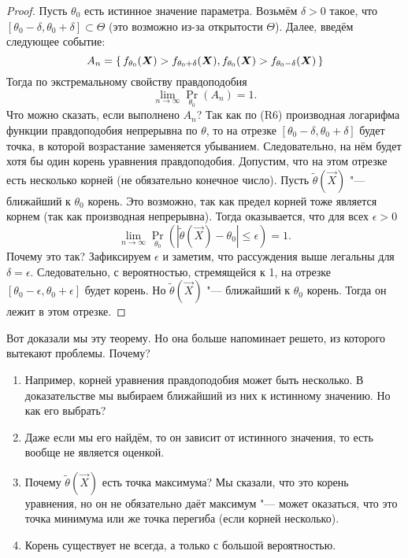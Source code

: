 \begin{proof}
    Пусть $\theta_{0}$ есть истинное значение параметра. Возьмём $\delta > 0$ такое, что $[\theta_{0} - \delta, \theta_{0} + \delta] \subset \Theta$ (это возможно из-за открытости $\Theta$). Далее, введём следующее событие:
    \[
        A_{n} = \set{f_{\theta_{0}}(\bm{X}) > f_{\theta_{0} + \delta}(\bm{X}), f_{\theta_{0}}(\bm{X}) > f_{\theta_{0} - \delta}(\bm{X})}
    \]
    Тогда по экстремальному свойству правдоподобия
    \[
        \lim\limits_{n \to \infty} \Pr_{\theta_{0}}(A_{n}) = 1.
    \]
    Что можно сказать, если выполнено $A_{n}$? Так как по (R6) производная логарифма функции правдоподобия непрерывна по $\theta$, то на отрезке $[\theta_{0} - \delta, \theta_{0} + \delta]$ будет точка, в которой возрастание заменяется убыванием. Следовательно, на нём будет хотя бы один корень уравнения правдоподобия. Допустим, что на этом отрезке есть несколько корней (не обязательно конечное число). Пусть $\tilde{\theta}(\vec{X})$ "--- ближайший к $\theta_{0}$ корень. Это возможно, так как предел корней тоже является корнем (так как производная непрерывна). Тогда оказывается, что для всех $\epsilon > 0$
    \[ 
        \lim\limits_{n \to \infty} \Pr_{\theta_{0}}(|\tilde{\theta}(\vec{X}) - \theta_{0}| \leq \epsilon) 
        = 1.
    \]
    Почему это так? Зафиксируем $\epsilon$ и заметим, что рассуждения выше легальны для $\delta = \epsilon$. Следовательно, с вероятностью, стремящейся к 1, на отрезке $[\theta_{0} - \epsilon, \theta_{0} + \epsilon]$ будет корень. Но $\tilde{\theta}(\vec{X})$ "--- ближайший к $\theta_{0}$ корень. Тогда он лежит в этом отрезке.
\end{proof}
Вот доказали мы эту теорему. Но она больше напоминает решето, из которого вытекают проблемы. Почему?
\begin{enumerate}
    \item Например, корней уравнения правдоподобия может быть несколько. В доказательстве мы выбираем ближайший из них к истинному значению. Но как его выбрать?
    \item Даже если мы его найдём, то он зависит от истинного значения, то есть вообще не является оценкой.
    \item Почему $\tilde{\theta}(\vec{X})$ есть точка максимума? Мы сказали, что это корень уравнения, но он не обязательно даёт максимум "--- может оказаться, что это точка минимума или же точка перегиба (если корней несколько).
    \item Корень существует не всегда, а только с большой вероятностью.
\end{enumerate}
